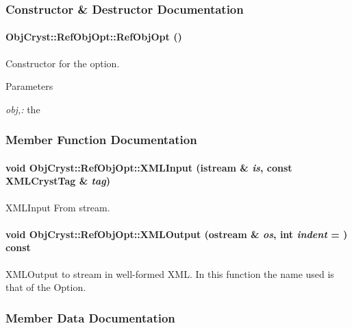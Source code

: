 \subsubsection{Constructor \& Destructor Documentation}
\paragraph[{RefObjOpt}]{\setlength{\rightskip}{0pt plus 5cm}ObjCryst::RefObjOpt::RefObjOpt ()}\hfill\label{a00077_ad4fd60241264e22179c9ab33fc58867f}


Constructor for the option. 
\begin{DoxyParams}{Parameters}
\item[{\em obj,:}]the \end{DoxyParams}


\subsubsection{Member Function Documentation}
\paragraph[{XMLInput}]{\setlength{\rightskip}{0pt plus 5cm}void ObjCryst::RefObjOpt::XMLInput (istream \& {\em is}, \/  const {\bf XMLCrystTag} \& {\em tag})}\hfill\label{a00077_a9562e469ee61a710e535594fe58f0744}


XMLInput From stream. 
\paragraph[{XMLOutput}]{\setlength{\rightskip}{0pt plus 5cm}void ObjCryst::RefObjOpt::XMLOutput (ostream \& {\em os}, \/  int {\em indent} = {}) const}\hfill\label{a00077_a5758abdb2557b2b2a2621e015fd8ad75}


XMLOutput to stream in well-\/formed XML. In this function the name used is that of the Option. 

\subsubsection{Member Data Documentation}
